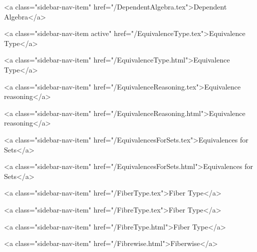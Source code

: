       
        
          <a class="sidebar-nav-item" href="/DependentAlgebra.tex">Dependent Algebra</a>
        
      
    
      
        
          <a class="sidebar-nav-item active" href="/EquivalenceType.tex">Equivalence Type</a>
        
      
    
      
        
          <a class="sidebar-nav-item" href="/EquivalenceType.html">Equivalence Type</a>
        
      
    
      
        
          <a class="sidebar-nav-item" href="/EquivalenceReasoning.tex">Equivalence reasoning</a>
        
      
    
      
        
          <a class="sidebar-nav-item" href="/EquivalenceReasoning.html">Equivalence reasoning</a>
        
      
    
      
        
          <a class="sidebar-nav-item" href="/EquivalencesForSets.tex">Equivalences for Sets</a>
        
      
    
      
        
          <a class="sidebar-nav-item" href="/EquivalencesForSets.html">Equivalences for Sets</a>
        
      
    
      
        
          <a class="sidebar-nav-item" href="/FiberType.tex">Fiber Type</a>
        
      
    
      
        
          <a class="sidebar-nav-item" href="/FibreType.tex">Fiber Type</a>
        
      
    
      
        
          <a class="sidebar-nav-item" href="/FibreType.html">Fiber Type</a>
        
      
    
      
        
          <a class="sidebar-nav-item" href="/Fibrewise.html">Fiberwise</a>
        
